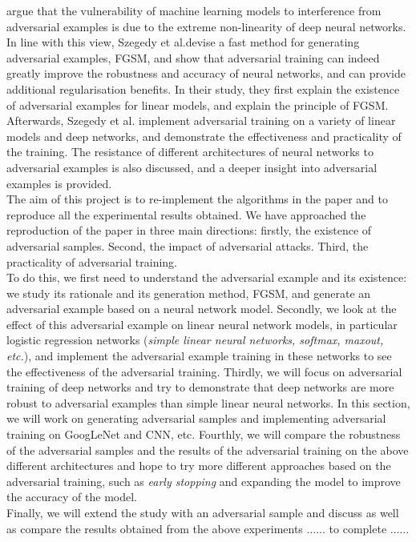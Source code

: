 


\cite{szegedy2013intriguing} argue that the vulnerability of machine learning models to interference from adversarial examples is due to the extreme non-linearity of deep neural networks. In line with this view, Szegedy et al.devise a fast method for generating adversarial examples, FGSM, and show that adversarial training can indeed greatly improve the robustness and accuracy of neural networks, and can provide additional regularisation benefits. In their study, they first explain the existence of adversarial examples for linear models, and explain the principle of FGSM. Afterwards, Szegedy et al. implement adversarial training on a variety of linear models and deep networks, and demonstrate the effectiveness and practicality of the training. The resistance of different architectures of neural networks to adversarial examples is also discussed, and a deeper insight into adversarial examples is provided.\\


The aim of this project is to re-implement the algorithms in the paper and to reproduce all the experimental results obtained. We have approached the reproduction of the paper in three main directions: firstly, the existence of adversarial samples. Second, the impact of adversarial attacks. Third, the practicality of adversarial training.\\


To do this, we first need to understand the adversarial example and its existence: we study its rationale and its generation method, FGSM, and generate an adversarial example based on a neural network model. Secondly, we look at the effect of this adversarial example on linear neural network models, in particular logistic regression networks (\textit{simple linear neural networks, softmax, maxout, etc.}), and implement the adversarial example training in these networks to see the effectiveness of the adversarial training. Thirdly, we will focus on adversarial training of deep networks and try to demonstrate that deep networks are more robust to adversarial examples than simple linear neural networks. In this section, we will work on generating adversarial samples and implementing adversarial training on GoogLeNet and CNN, etc. Fourthly, we will compare the robustness of the adversarial samples and the results of the adversarial training on the above different architectures and hope to try more different approaches based on the adversarial training, such as  \textit{early stopping} and expanding the model to improve the accuracy of the model.\\

Finally, we will extend the study with an adversarial sample and discuss as well as compare the results obtained from the above experiments ...... to complete ......